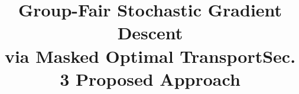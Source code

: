 \documentclass{article}
\title{Group-Fair Stochastic Gradient Descent \\ via Masked Optimal Transport}
\title{Sec. 3 Proposed Approach}
\theoremstyle{definition}
\begin{document}
\ninept\maketitle

\end{document}
